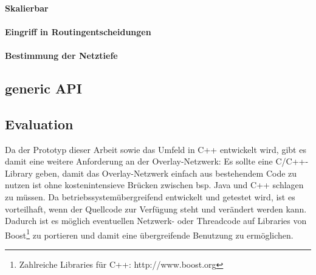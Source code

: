 \paragraph{Skalierbar} 

\paragraph{Eingriff in Routingentscheidungen}

\paragraph{Bestimmung der Netztiefe}




\subsection{generic API}
\label{chap:grundlagen:overlay:generic_api}
\cite{citeulike:6643572} %

\subsection{Evaluation}
Da der Prototyp dieser Arbeit sowie das Umfeld in C++ entwickelt wird, gibt es damit eine weitere Anforderung an der Overlay-Netzwerk: Es sollte eine C/C++-Library geben, damit das Overlay-Netzwerk einfach aus bestehendem Code zu nutzen ist ohne kostenintensieve Brücken zwischen bsp. Java und C++ schlagen zu müssen. Da betriebssystemübergreifend entwickelt und getestet wird, ist es vorteilhaft, wenn der Quellcode zur Verfügung steht und verändert werden kann. Dadurch ist es möglich eventuellen Netzwerk- oder Threadcode auf Libraries von Boost\footnote{Zahlreiche Libraries für C++: http://www.boost.org} zu portieren und damit eine übergreifende Benutzung zu ermöglichen.

\cite{Castro2003} %

\cite{Fahmy2003} %

\cite{citeulike:780210} %

\cite{Zhao2001} %
